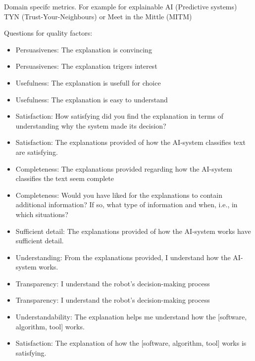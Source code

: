 Domain specifc metrics. For example for explainable AI (Predictive systems) TYN (Trust-Your-Neighbours) or Meet in the Mittle (MITM) \cite{martin_evaluating_2021}

Questions for quality factors:

\begin{itemize}
    \item Persuasivenes: The explanation is convincing \cite{sato_action-triggering_2019, sato_context_nodate}
    \item Persuasivenes: The explanation trigers interest \cite{sato_action-triggering_2019, sato_context_nodate}
    \item Usefulness: The explanation is usefull for choice \cite{sato_action-triggering_2019, sato_context_nodate}
    \item Usefulness: The explanation is easy to understand \cite{sato_action-triggering_2019, sato_context_nodate}
    \item Satisfaction: How satisfying did you find the explanation in terms of understanding why the system made its decision? \cite{riveiro_thats_2021}
    \item Satisfaction: The explanations provided of how the AI-system classifies text are satisfying. \cite{riveiro_thats_2021}
    \item Completeness: The explanations provided regarding how the AI-system classifies the text seem complete
 \cite{riveiro_thats_2021}
    \item Completeness: Would you have liked for the explanations to contain additional information? If so, what type of information and when, i.e., in which situations?
 \cite{riveiro_thats_2021}
    \item Sufficient detail: The explanations provided of how the AI-system works have sufficient detail.
 \cite{riveiro_thats_2021}
    \item Understanding: From the explanations provided, I understand how the AI-system works.
 \cite{riveiro_thats_2021}
 \item Transparency: I understand the robot’s decision-making process \cite{wang_is_2018}
 \item Transparency: I understand the robot’s decision-making process \cite{wang_is_2018}
 \item Understandability: The explanation helps me understand how the [software, algorithm, tool] works. \cite{hoffman_metrics_nodate}
 \item Satisfaction: The explanation of how the [software, algorithm, tool] works is satisfying. \cite{hoffman_metrics_nodate}

\end{itemize}
